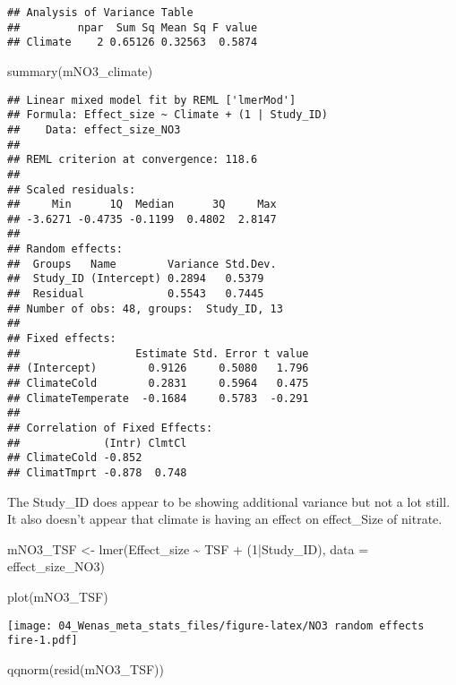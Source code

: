 \documentclass[
]{article}
\newenvironment{Shaded}{\begin{snugshade}}{\end{snugshade}}
\newcommand{\AttributeTok}[1]{\textcolor[rgb]{0.77,0.63,0.00}{#1}}
\newcommand{\DecValTok}[1]{\textcolor[rgb]{0.00,0.00,0.81}{#1}}
\newcommand{\FunctionTok}[1]{\textcolor[rgb]{0.00,0.00,0.00}{#1}}
\newcommand{\NormalTok}[1]{#1}
\newcommand{\OtherTok}[1]{\textcolor[rgb]{0.56,0.35,0.01}{#1}}
\newcommand{\SpecialCharTok}[1]{\textcolor[rgb]{0.00,0.00,0.00}{#1}}
\begin{document}
\begin{verbatim}
## Analysis of Variance Table
##         npar  Sum Sq Mean Sq F value
## Climate    2 0.65126 0.32563  0.5874
\end{verbatim}

\begin{Shaded}
\begin{Highlighting}[]
\FunctionTok{summary}\NormalTok{(mNO3\_climate) }
\end{Highlighting}
\end{Shaded}

\begin{verbatim}
## Linear mixed model fit by REML ['lmerMod']
## Formula: Effect_size ~ Climate + (1 | Study_ID)
##    Data: effect_size_NO3
## 
## REML criterion at convergence: 118.6
## 
## Scaled residuals: 
##     Min      1Q  Median      3Q     Max 
## -3.6271 -0.4735 -0.1199  0.4802  2.8147 
## 
## Random effects:
##  Groups   Name        Variance Std.Dev.
##  Study_ID (Intercept) 0.2894   0.5379  
##  Residual             0.5543   0.7445  
## Number of obs: 48, groups:  Study_ID, 13
## 
## Fixed effects:
##                  Estimate Std. Error t value
## (Intercept)        0.9126     0.5080   1.796
## ClimateCold        0.2831     0.5964   0.475
## ClimateTemperate  -0.1684     0.5783  -0.291
## 
## Correlation of Fixed Effects:
##             (Intr) ClmtCl
## ClimateCold -0.852       
## ClimatTmprt -0.878  0.748
\end{verbatim}

The Study\_ID does appear to be showing additional variance but not a
lot still. It also doesn't appear that climate is having an effect on
effect\_Size of nitrate.

\begin{Shaded}
\begin{Highlighting}[]
\NormalTok{mNO3\_TSF }\OtherTok{\textless{}{-}} \FunctionTok{lmer}\NormalTok{(Effect\_size }\SpecialCharTok{\textasciitilde{}}\NormalTok{ TSF }\SpecialCharTok{+}\NormalTok{ (}\DecValTok{1}\SpecialCharTok{|}\NormalTok{Study\_ID), }\AttributeTok{data =}\NormalTok{ effect\_size\_NO3)}

\FunctionTok{plot}\NormalTok{(mNO3\_TSF)}
\end{Highlighting}
\end{Shaded}

\texttt{[image: 04\_Wenas\_meta\_stats\_files/figure-latex/NO3 random effects fire-1.pdf]}

\begin{Shaded}
\begin{Highlighting}[]
\FunctionTok{qqnorm}\NormalTok{(}\FunctionTok{resid}\NormalTok{(mNO3\_TSF))}
\end{Highlighting}
\end{Shaded}
\end{document}
